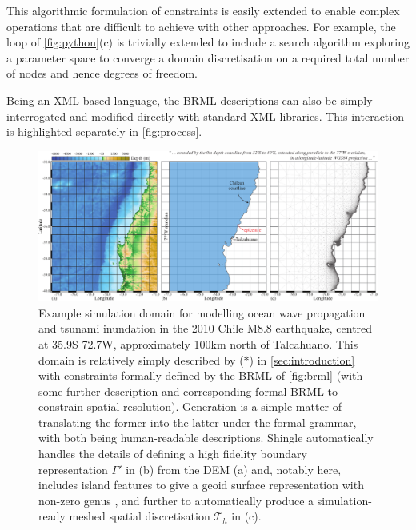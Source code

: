 \documentclass[a4paper, 10pt]{book}
\providecommand{\shingle}{Shingle\xspace}
\providecommand{\brml}{BRML\xspace}
\providecommand{\brep}{boundary representation\xspace}
\providecommand{\refdescriptionquotelink}{(\protect\hyperlink{description}{$\ast$})\xspace}
\begin{document}
This algorithmic formulation of constraints is easily extended to enable
complex operations that are difficult to achieve with other approaches.
%
For example, the loop of \cref{fig:python}(c) is trivially extended to include a search algorithm exploring a parameter space to converge a domain discretisation on a required total number of nodes and hence degrees of freedom.

Being an XML based language, the \brml descriptions can also be simply interrogated and modified directly
with standard XML libraries.  This interaction is highlighted separately in \cref{fig:process}.


%
\begin{figure}[!h]
\begin{center}
\includegraphics[width=\textwidth]{fig/Chile_Talcahuano.pdf}
\end{center}
\caption{
Example simulation domain for modelling ocean wave propagation and tsunami inundation
in the 2010 Chile M8.8 earthquake, centred at
35.9\degree S 72.7\degree W,
approximately 100km north of Talcahuano.
%
This domain is relatively simply described by
\refdescriptionquotelink
in \cref{sec:introduction}
with constraints formally defined
by the \brml of \cref{fig:brml}
(with some further description and corresponding formal \brml to constrain spatial resolution).
%
Generation is a simple matter of translating the former into the latter under the formal grammar, with both being human-readable descriptions.
\shingle automatically handles the details of defining a high fidelity \brep
$\Gamma'$ in (b)
from the \cite{gebco} DEM (a)
and, notably here, includes island features
to give a geoid surface representation with non-zero genus \citep[following the approach of][]{candybrep}, and further to automatically produce a simulation-ready meshed spatial discretisation
$\mathcal{T}_h$ in (c).
%
}
\label{fig:chile}
\end{figure}
%
\end{document}
